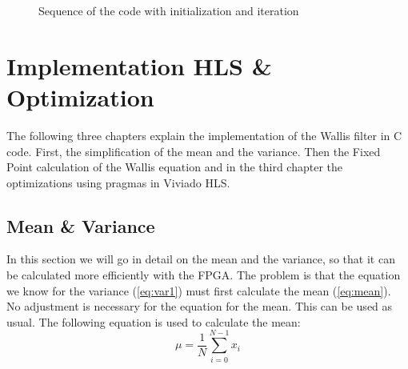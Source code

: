 \begin{figure}[tb!]
    \centering
    \begin{adjustbox}{max width=\textwidth}
        
    \end{adjustbox}
    \caption{Sequence of the code with initialization and iteration}
    \label{fig:sequence}
\end{figure}


\section{Implementation HLS \& Optimization}
The following three chapters explain the implementation of the Wallis filter in C code. First, the simplification of the mean and the variance. Then the Fixed Point calculation of the Wallis equation and in the third chapter the optimizations using pragmas in Viviado HLS.

\subsection{Mean \& Variance}
In this section we will go in detail on the mean and the variance, so that it can be calculated more efficiently with the FPGA. The problem is that the equation we know for the variance (\ref{eq:var1}) must first calculate the mean (\ref{eq:mean}). \\
No adjustment is necessary for the equation for the mean. This can be used as usual. The following equation	is used to calculate the mean:
\begin{equation}
    \mu = \frac{1}{N} \sum_{i = 0}^{N - 1} x_{i}
    \label{eq:mean}
\end{equation} 

